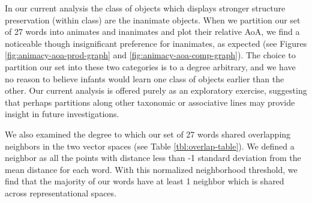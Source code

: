 \documentclass[10pt, letterpaper]{article}
\begin{document}
In our current analysis the class of objects which displays stronger
structure preservation (within class) are the inanimate objects. When we
partition our set of 27 words into animates and inanimates and plot
their relative AoA, we find a noticeable though insignificant preference
for inanimates, as expected (see Figures
\ref{fig:animacy-aoa-prod-graph} and \ref{fig:animacy-aoa-comp-graph}).
The choice to partition our set into these two categories is to a degree
arbitrary, and we have no reason to believe infants would learn one
class of objects earlier than the other. Our current analysis is offered
purely as an exploratory exercise, suggesting that perhaps partitions
along other taxonomic or associative lines may provide insight in future
investigations.

We also examined the degree to which our set of 27 words shared
overlapping neighbors in the two vector spaces (see Table
\ref{tbl:overlap-table}). We defined a neighbor as all the points with
distance less than -1 standard deviation from the mean distance for each
word. With this normalized neighborhood threshold, we find that the
majority of our words have at least 1 neighbor which is shared across
representational spaces.
\end{document}
